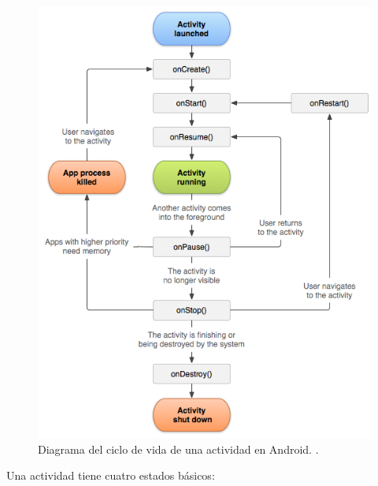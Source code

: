 \begin{figure}[h] \centering
    \includegraphics[width=12cm]{graphs/activity_lifecycle.png} \caption{Diagrama del ciclo de vida de una actividad en Android. \cite{androiddevguide}.}\label{fig:diagrama:ActivityLifecycle}
\end{figure}

Una actividad tiene cuatro estados básicos:

